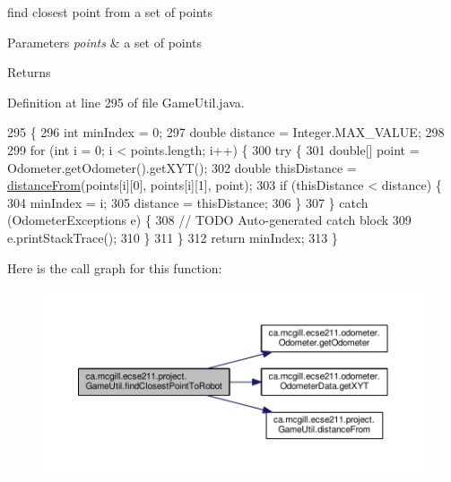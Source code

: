 find closest point from a set of points


\begin{DoxyParams}{Parameters}
{\em points} & a set of points \\
\hline
\end{DoxyParams}
\begin{DoxyReturn}{Returns}

\end{DoxyReturn}


Definition at line 295 of file Game\+Util.\+java.


\begin{DoxyCode}
295                                                             \{
296     \textcolor{keywordtype}{int} minIndex = 0;
297     \textcolor{keywordtype}{double} distance = Integer.MAX\_VALUE;
298 
299     \textcolor{keywordflow}{for} (\textcolor{keywordtype}{int} i = 0; i < points.length; i++) \{
300       \textcolor{keywordflow}{try} \{
301         \textcolor{keywordtype}{double}[] point = Odometer.getOdometer().getXYT();
302         \textcolor{keywordtype}{double} thisDistance = \hyperlink{classca_1_1mcgill_1_1ecse211_1_1project_1_1_game_util_a6fb324a3d5e42414c83dfd8bd5910b56}{distanceFrom}(points[i][0], points[i][1], point);
303         \textcolor{keywordflow}{if} (thisDistance < distance) \{
304           minIndex = i;
305           distance = thisDistance;
306         \}
307       \} \textcolor{keywordflow}{catch} (OdometerExceptions e) \{
308         \textcolor{comment}{// TODO Auto-generated catch block}
309         e.printStackTrace();
310       \}
311     \}
312     \textcolor{keywordflow}{return} minIndex;
313   \}
\end{DoxyCode}
Here is the call graph for this function\+:\nopagebreak
\begin{figure}[H]
\begin{center}
\leavevmode
\includegraphics[width=350pt]{classca_1_1mcgill_1_1ecse211_1_1project_1_1_game_util_a6e0ee94b800ca3727ca8009782abda14_cgraph}
\end{center}
\end{figure}

